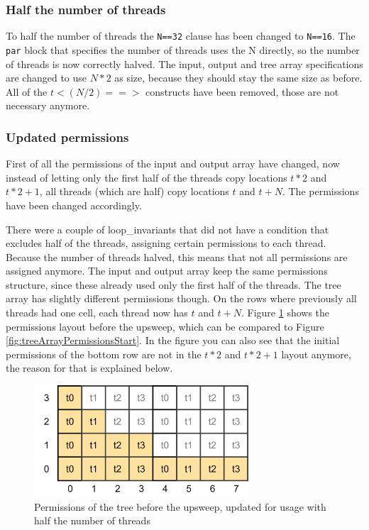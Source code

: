 \documentclass[a4paper]{article}
\newcommand{\code}[1]{\texttt{\small \color{inline}#1}} %
\begin{document}
\subsubsection{Half the number of threads}
To half the number of threads the \code{N==32} clause has been changed to \code{N==16}. The \code{par} block that specifies the number of threads uses the N directly, so the number of threads is now correctly halved. The input, output and tree array specifications are changed to use $N*2$ as size, because they should stay the same size as before. All of the $t<(N/2) ==>$ constructs have been removed, those are not necessary anymore.

\subsubsection{Updated permissions}
First of all the permissions of the input and output array have changed, now instead of letting only the first half of the threads copy locations $t*2$ and $t*2+1$, all threads (which are half) copy locations $t$ and $t+N$. The permissions have been changed accordingly.

There were a couple of loop\_invariants that did not have a condition that excludes half of the threads, assigning certain permissions to each thread. Because the number of threads halved, this means that not all permissions are assigned anymore. The input and output array keep the same permissions structure, since these already used only the first half of the threads. The tree array has slightly different permissions though. On the rows where previously all threads had one cell, each thread now has $t$ and $t+N$. Figure \ref{fig:treeArrayPermissionsStartHalfThreads} shows the permissions layout before the upsweep, which can be compared to Figure \ref{fig:treeArrayPermissionsStart}. In the figure you can also see that the initial permissions of the bottom row are not in the $t*2$ and $t*2+1$ layout anymore, the reason for that is explained below.

\begin{figure}[htb!]
	\centering
	\includegraphics[width=80mm]{../images/tree-permissions-start-halfthreads-v1.png}
	\caption{Permissions of the tree before the upsweep, updated for usage with half the number of threads}
	\label{fig:treeArrayPermissionsStartHalfThreads}
\end{figure}
\FloatBarrier
\end{document}
